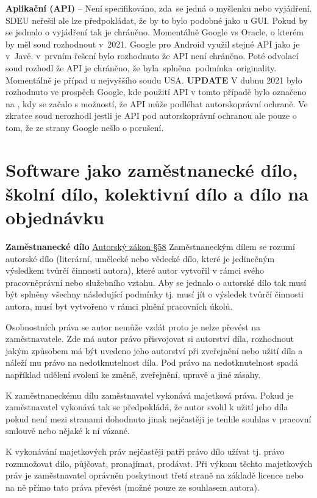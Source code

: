\textbf{Aplikační (API)} -- Není specifikováno, zda~se jedná o myšlenku nebo vyjádření. SDEU neřešil ale lze předpokládat, že by to bylo podobné jako u GUI. Pokud by se jednalo o vyjádření tak je chráněno. Momentálně Google vs Oracle, o kterém by měl soud rozhodnout v~2021. Google pro Android využil stejné API jako je v~Javě. v~prvním řešení bylo rozhodnuto že API není chráněno. Poté odvolací soud rozhodl že API je chráněno, že byla~splněna~podmínka~originality. Momentálně je případ u nejvyššího soudu USA. \textbf{UPDATE} V dubnu 2021 bylo rozhodnuto ve prospěch Google, kde použití API v tomto případě bylo označeno na , kdy se začalo s možností, že API může podléhat autorskoprávní ochraně. Ve zkratce soud nerozhodl jestli je API pod autorskoprávní ochranou ale pouze o tom, že ze strany Google nešlo o porušení.  




\newpage
\section{Software jako zaměstnanecké dílo, školní dílo, kolektivní dílo a dílo na objednávku}

\textbf{Zaměstnanecké dílo} \href{https://www.zakonyprolidi.cz/cs/2000-121#p58}{Autorský zákon §58}
Zaměstnaneckým dílem se rozumí autorské dílo (literární, umělecké nebo vědecké dílo, které je jedinečným výsledkem tvůrčí činnosti autora), které autor vytvořil v rámci svého pracovněprávní nebo služebního vztahu. Aby se jednalo o autorské dílo tak musí být splněny všechny následující podmínky tj. musí jít o výsledek tvůrčí činnosti autora, musí byt vytvořeno v rámci plnění pracovních úkolů.

Osobnostních práva se autor nemůže vzdát proto je nelze převést na zaměstnavatele. Zde má autor právo přisvojovat si autorství díla, rozhodnout jakým způsobem má být uvedeno jeho autorství při zveřejnění nebo užití díla a náleží mu právo na nedotknutelnost díla. Pod právo na nedotknutelnost spadá například udělení svolení ke změně, zveřejnění, upravě a jiné zásahy.

K zaměstnaneckému dílu zaměstnavatel vykonává majetková práva. Pokud je zaměstnavatel vykonává tak se předpokládá, že autor svolil k užití jeho díla pokud není mezi stranami dohodnuto jinak nejčastěji je tenhle souhlas v pracovní smlouvě nebo nějaké k ní vázané. 

K vykonávání majetkových práv nejčastěji patří právo dílo užívat tj. právo rozmnožovat dílo, půjčovat, pronajímat, prodávat. Při výkonu těchto majetkových práv je zaměstnavatel oprávněn poskytnout třetí straně na základě licence nebo na ně přímo tato práva převést (možné pouze ze souhlasem autora).

